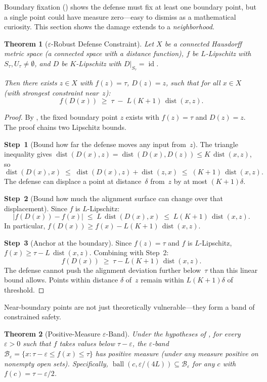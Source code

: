 \documentclass[11pt]{article}
\newtheorem{theorem}{Theorem}[section]
\newcommand{\id}{\operatorname{id}}
\newcommand{\dist}{\operatorname{dist}}
\begin{document}
Boundary fixation () shows the defense must fix at
least one boundary point, but a single point could have measure zero---easy
to dismiss as a mathematical curiosity. This section shows the damage
extends to a \emph{neighborhood}.

\begin{theorem}[$\varepsilon$-Robust Defense Constraint]
\label{thm:eps-robust}
Let $X$ be a connected Hausdorff metric space (a connected space with a
distance function), $f$ be $L$-Lipschitz
with $S_\tau, U_\tau \neq \emptyset$, and $D$ be $K$-Lipschitz with
$D|_{S_\tau} = \id$.

Then there exists $z \in X$ with $f(z) = \tau$, $D(z) = z$, such that
for all $x \in X$ (with strongest constraint near~$z$):
\begin{equation}
  f(D(x)) \;\geq\; \tau \;-\; L(K+1)\,\dist(x, z).
\end{equation}
\end{theorem}

\begin{proof}
By , the fixed boundary point $z$ exists with
$f(z) = \tau$ and $D(z) = z$. The proof chains two Lipschitz bounds.

\textbf{Step~1} (Bound how far the defense moves any input from~$z$).
The triangle inequality gives
$\dist(D(x), z) = \dist(D(x), D(z)) \leq K\,\dist(x, z)$, so
\[
  \dist(D(x), x)
  \;\leq\; \dist(D(x), z) + \dist(z, x)
  \;\leq\; (K+1)\,\dist(x, z).
\]
The defense can displace a point at distance~$\delta$ from~$z$ by at
most $(K+1)\delta$.

\textbf{Step~2} (Bound how much the alignment surface can change over
that displacement).
Since $f$ is $L$-Lipschitz:
\[
  |f(D(x)) - f(x)| \;\leq\; L\,\dist(D(x), x)
                     \;\leq\; L(K+1)\,\dist(x, z).
\]
In particular, $f(D(x)) \geq f(x) - L(K+1)\,\dist(x,z)$.

\textbf{Step~3} (Anchor at the boundary).
Since $f(z) = \tau$ and $f$ is $L$-Lipschitz,
$f(x) \geq \tau - L\,\dist(x,z)$. Combining with Step~2:
\[
  f(D(x)) \;\geq\; \tau - L(K+1)\,\dist(x,z).
\]
The defense cannot push the alignment deviation further below~$\tau$
than this linear bound allows. Points within distance
$\delta$ of~$z$ remain within $L(K+1)\delta$ of threshold.
\end{proof}

Near-boundary points are not just theoretically vulnerable---they form a
band of constrained safety.

\begin{theorem}[Positive-Measure $\varepsilon$-Band]
\label{thm:band-measure}
Under the hypotheses of , for every
$\varepsilon > 0$ such that $f$ takes values below $\tau - \varepsilon$,
the $\varepsilon$-band
$\mathcal{B}_\varepsilon = \{x : \tau - \varepsilon \leq f(x)
\leq \tau\}$
has positive measure (under any measure positive on nonempty open sets).
Specifically, $\operatorname{ball}(c, \varepsilon/(4L)) \subseteq
\mathcal{B}_\varepsilon$ for any $c$ with $f(c) = \tau - \varepsilon/2$.
\end{theorem}
\end{document}
